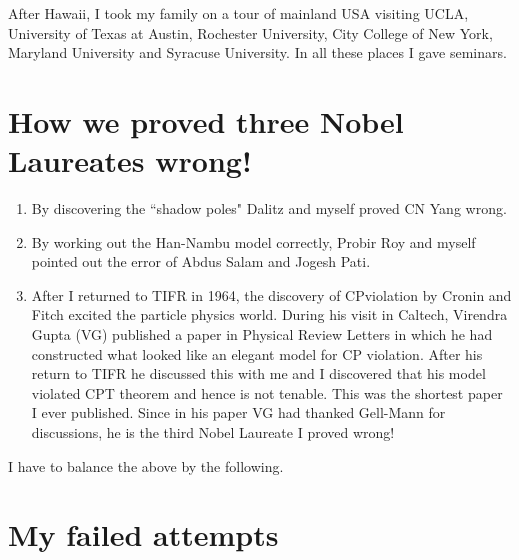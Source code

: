 After Hawaii, I took my family on a tour of mainland USA visiting UCLA, 
University of Texas at Austin, Rochester University, City College of New 
York, Maryland University and Syracuse University. In all these places I 
gave seminars.

\section*{How we proved three Nobel Laureates wrong!}

\begin{enumerate}
\itemsep=0pt
\item By discovering the ``shadow poles" Dalitz and myself proved CN Yang 
wrong.
\item By working out the Han-Nambu model correctly, Probir Roy and myself 
pointed out the error of Abdus Salam and Jogesh Pati.
\item After I returned to TIFR in 1964, the discovery of CP\break violation by 
Cronin and Fitch excited the particle physics world. During his visit in 
Caltech, Virendra Gupta (VG) published a paper in Physical Review 
Letters in which he had constructed what looked like an elegant model 
for CP violation. After his return to TIFR he discussed this with me and 
I discovered that his model violated CPT theorem and hence is not 
tenable. This was the shortest paper I ever published. Since in his 
paper VG had thanked Gell-Mann for discussions, he is the third Nobel 
Laureate I proved wrong!
\end{enumerate}

I have to balance the above by the following.

\section*{My failed attempts}


